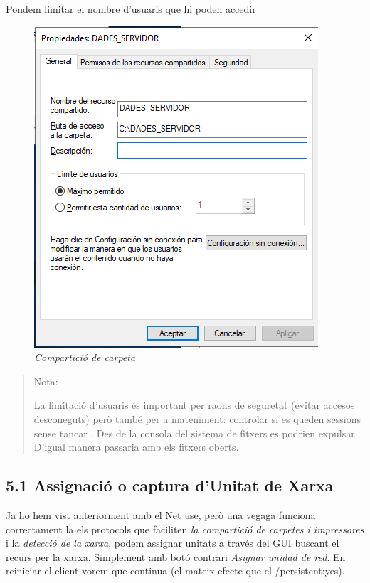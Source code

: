 \documentclass[
  a4paper,
]{article}
\begin{document}
Pondem limitar el nombre d'usuaris que hi poden accedir

\begin{figure}
\centering
\includegraphics{png/ADDS/Compartir2.png}
\caption{\emph{Compartició de carpeta}}
\end{figure}

\begin{quote}
Nota:

La limitació d'usuaris és important per raons de seguretat (evitar
accesos desconeguts) però també per a mateniment: controlar si es queden
sessions sense tancar . Des de la consola del sistema de fitxers es
podrien expulsar. D'igual manera passaria amb els fitxers oberts.
\end{quote}

\subsection{5.1 Assignació o captura d'Unitat de
Xarxa}\label{assignaciuxf3-o-captura-dunitat-de-xarxa}

Ja ho hem vist anteriorment amb el Net use, però una vegaga funciona
correctament la els protocols que faciliten \emph{la compartició de
carpetes i impressores} i la \emph{detecció de la xarxa}, podem assignar
unitats a través del GUI buscant el recurs per la xarxa. Simplement amb
botó contrari \emph{Asignar unidad de red}. En reiniciar el client vorem
que continua (el mateix efecte que el /persistent:yes).
\end{document}
